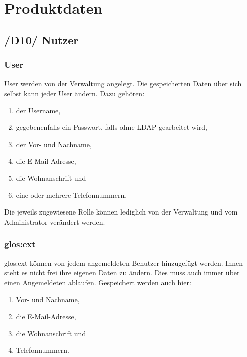 
\chapter{Produktdaten}

\section{/D10/ Nutzer}
\subsection{User}
User werden von der Verwaltung angelegt. Die gespeicherten Daten über sich selbst kann jeder User ändern. Dazu gehören: 
\begin{enumerate}
	\item der Username, 
	\item gegebenenfalls ein Passwort, falls ohne \gls{LDAP} gearbeitet wird,
	\item der Vor- und Nachname, 
	\item die E-Mail-Adresse, 
	\item die Wohnanschrift und 
	\item eine oder mehrere Telefonnummern. 
\end{enumerate} 
Die jeweils zugewiesene Rolle können lediglich von der Verwaltung und vom Administrator verändert werden.

\subsection{\gls{glos:ext}}
\gls{glos:ext} können von jedem angemeldeten Benutzer hinzugefügt werden. Ihnen steht es nicht frei ihre eigenen Daten zu ändern. Dies muss auch immer über einen Angemeldeten ablaufen. Gespeichert werden auch hier: 
\begin{enumerate}
	\item Vor- und Nachname, 
	\item die E-Mail-Adresse, 
	\item die Wohnanschrift und 
	\item Telefonnummern.
\end{enumerate}

